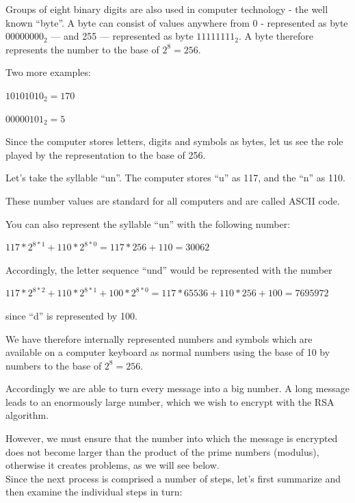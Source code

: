 \documentclass[a4paper,11pt,oneside,openright,titlepage]{scrbook}
\begin{document}
Groups of eight binary digits are also used in computer technology -
the well known ``byte''. A byte can consist of values anywhere from 0
- represented as byte $00000000_2$ --- and 255 --- represented as byte
$11111111_2$. A byte therefore represents the number to the base of
$2^8 = 256$.

Two more examples:

$ 10101010_2 = 170 $

$ 00000101_2 = 5 $

Since the computer stores letters, digits and symbols as bytes, let us
see the role played by the representation to the base of 256.


\clearpage
Let's take the syllable ``un''. The computer stores ``u'' as 117, and
the ``n'' as 110.

These number values are standard for all computers and are called
ASCII code.

You can also represent the syllable ``un'' with the following number:

$117 * 2^{8*1} + 110 * 2^{8*0} = 117 * 256 + 110 = 30062$

Accordingly, the letter sequence ``und'' would be represented with the
number

$117 * 2^{8*2} + 110 * 2^{8*1} + 100 * 2^{8*0} = 117 * 65536 + 110 * 256 + 100 = 7695972$

since ``d'' is represented by 100.

We have therefore internally represented numbers and symbols which are
available on a computer keyboard as normal numbers using the base of
10 by numbers to the base of $2^8 = 256$.

Accordingly we are able to turn every message into a big number. A
long message leads to an enormously large number, which we wish to
encrypt with the RSA algorithm.

However, we must ensure that the number into which the message is
encrypted does not become larger than the product of the prime numbers
(modulus), otherwise it creates problems, as we will see below.\\

Since the next process is comprised a number of steps, let's first
summarize and then examine the individual steps in turn:
\end{document}
